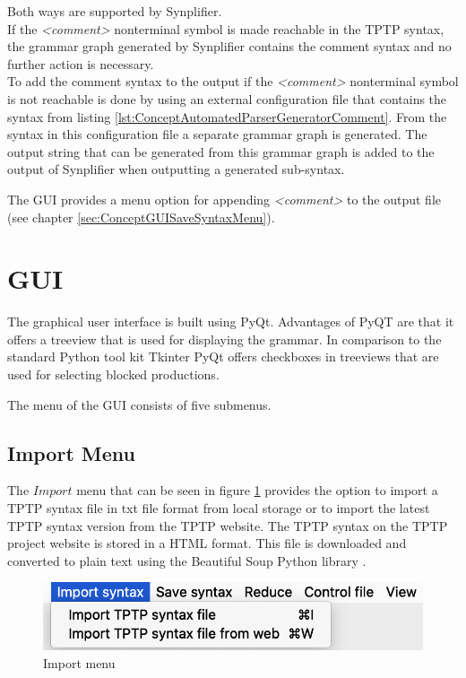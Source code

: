 Both ways are supported by \ac{Synplifier}.\\
If the \textit{<comment>} nonterminal symbol is made reachable in the \ac{TPTP} syntax, the grammar graph generated by \ac{Synplifier} contains the comment syntax and no further action is necessary.\\
To add the comment syntax to the output if the \textit{<comment>} nonterminal symbol is not reachable is done by using an external configuration file that contains the syntax from listing \ref{lst:ConceptAutomatedParserGeneratorComment}.
From the syntax in this configuration file a separate grammar graph is generated. The output string that can be generated from this grammar graph is added to the output of \ac{Synplifier} when outputting a generated sub-syntax.

The GUI provides a menu option for appending \textit{<comment>} to the output file (see chapter \ref{sec:ConceptGUISaveSyntaxMenu}).

\section{GUI}\label{sec:ConceptGUI}

The graphical user interface is built using PyQt. Advantages of PyQT are that it offers a treeview that is used for displaying the grammar. In comparison to the standard Python tool kit Tkinter PyQt offers checkboxes in treeviews \cite{Tkinter} that are used for selecting blocked productions.

The menu of the GUI consists of five submenus.

\subsection{Import Menu}\label{sec:ConceptGUIImportMenu}

The $Import$ menu that can be seen in figure \ref{fig:import} provides the option to import a \ac{TPTP} syntax file in txt file format from local storage or to import the latest \ac{TPTP} syntax version from the \ac{TPTP} website.
The \ac{TPTP} syntax on the \ac{TPTP} project website is stored in a HTML format.
This file is downloaded and converted to plain text using the Beautiful Soup Python library \cite{BeautifulSoup}.

\begin{figure}[H]
\centering
\includegraphics[width=.7\textwidth]{images/import.png}
\caption{Import menu}
\label{fig:import}
\end{figure}

